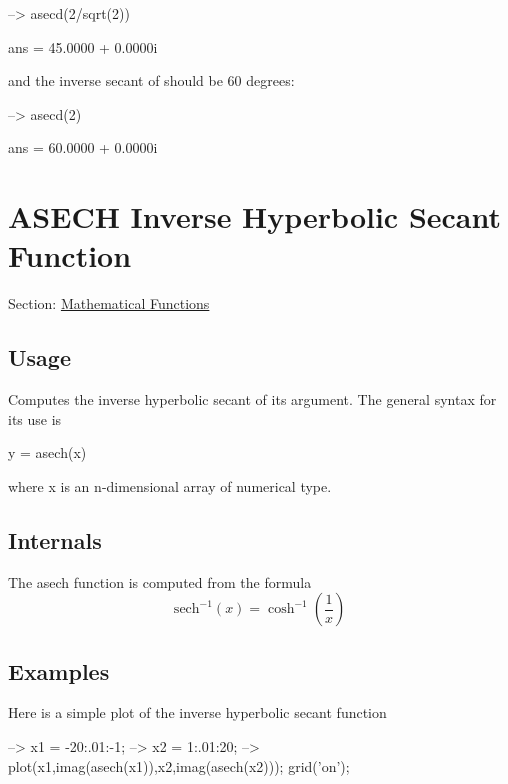 \begin{DoxyVerbInclude}
--> asecd(2/sqrt(2))

ans = 
  45.0000 +  0.0000i 
\end{DoxyVerbInclude}


and the inverse secant of {} should be 60 degrees\-:


\begin{DoxyVerbInclude}
--> asecd(2)

ans = 
  60.0000 +  0.0000i 
\end{DoxyVerbInclude}
 \hypertarget{mathfunctions_asech}{}\section{A\-S\-E\-C\-H Inverse Hyperbolic Secant Function}\label{mathfunctions_asech}
Section\-: \hyperlink{sec_mathfunctions}{Mathematical Functions} \hypertarget{vtkwidgets_vtkxyplotwidget_Usage}{}\subsection{Usage}\label{vtkwidgets_vtkxyplotwidget_Usage}
Computes the inverse hyperbolic secant of its argument. The general syntax for its use is \begin{DoxyVerb}  y = asech(x)
\end{DoxyVerb}
 where {\ttfamily x} is an {\ttfamily n}-\/dimensional array of numerical type. \hypertarget{transforms_svd_Function}{}\subsection{Internals}\label{transforms_svd_Function}
The {\ttfamily asech} function is computed from the formula \[ \mathrm{sech}^{-1}(x) = \cosh^{-1}\left(\frac{1}{x}\right) \] \hypertarget{variables_matrix_Examples}{}\subsection{Examples}\label{variables_matrix_Examples}
Here is a simple plot of the inverse hyperbolic secant function


\begin{DoxyVerbInclude}
--> x1 = -20:.01:-1;
--> x2 = 1:.01:20;
--> plot(x1,imag(asech(x1)),x2,imag(asech(x2))); grid('on');
\end{DoxyVerbInclude}


